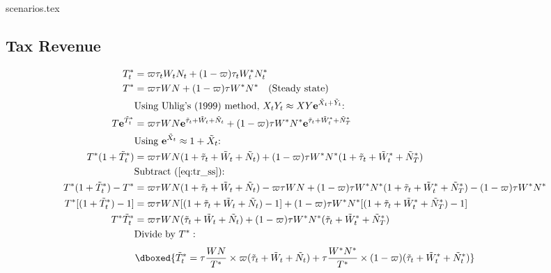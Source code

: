 \pagebreak
{scenarios.tex}
\pagebreak
\tiny
\subsection*{Tax Revenue}
\begin{align*}
    T^*_t &= \varpi\tau_t W_t N_t + (1-\varpi)\tau_t W^*_t N^*_t \\
    T^* &= \varpi\tau W N + (1-\varpi)\tau W^* N^* \label{eq:tr_ss} \quad \text{(Steady state)}\\
    &\text{Using Uhlig's (1999) method, $X_tY_t \approx XY\mathbf{e}^{\tilde{X}_t + \tilde{Y}_t}$: }\\
    T\mathbf{e}^{\tilde{T}^*_t} &= \varpi \tau W N \mathbf{e}^{\tilde{\tau}_t+\tilde{W}_t+\tilde{N}_t} + (1-\varpi) \tau W^* N^* \mathbf{e}^{\tilde{\tau}_t+\tilde{W}^*_t+\tilde{N}^*_T} \\
    &\text{Using $\mathbf{e}^{\tilde{X}_t} \approx 1 + {\tilde{X}_t}$: }\\
    T^* (1 + {\tilde{T}^*_t}) &= \varpi \tau W N (1 + {\tilde{\tau}_t+\tilde{W}_t+\tilde{N}_t}) + (1-\varpi) \tau W^* N^* (1 + {\tilde{\tau}_t+\tilde{W}^*_t+\tilde{N}^*_T}) \\
    &\text{Subtract (\ref{eq:tr_ss}): } \\
    T^* (1 + {\tilde{T}^*_t}) - T^* &= \varpi \tau W N (1 + {\tilde{\tau}_t+\tilde{W}_t+\tilde{N}_t}) - \varpi\tau W N + (1-\varpi) \tau W^* N^* (1 + {\tilde{\tau}_t+\tilde{W}^*_t+\tilde{N}^*_T}) - (1-\varpi)\tau W^* N^* \\
    T^*[(1 + {\tilde{T}^*_t}) - 1] &= \varpi \tau W N [(1 + {\tilde{\tau}_t+\tilde{W}_t+\tilde{N}_t}) - 1] + (1-\varpi) \tau W^* N^* [(1 + {\tilde{\tau}_t+\tilde{W}^*_t+\tilde{N}^*_T}) - 1] \\
    T^*\tilde{T}^*_t &= \varpi \tau W N (\tilde{\tau}_t + \tilde{W}_t + \tilde{N}_t) + (1-\varpi) \tau W^* N^* (\tilde{\tau}_t+\tilde{W}^*_t+\tilde{N}^*_T) \\
    &\text{Divide by $T^*$}:
\end{align*}
\begin{equation}
    \dboxed{\tilde{T}^*_t = \tau\frac{ W N}{T^*}\times \varpi (\tilde{\tau}_t + \tilde{W}_t + \tilde{N}_t) + \tau \frac{ W^* N^*}{T^*} \times (1-\varpi) (\tilde{\tau}_t+\tilde{W}^*_t+\tilde{N}^*_t)}
\end{equation}

